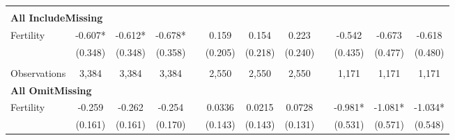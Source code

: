 \begin{landscape}
\begin{table}[htpb!]
\begin{center}
\begin{tabular}{lcccp{2mm}cccp{2mm}ccc}
\begin{footnotesize}\end{footnotesize}\\ 
\multicolumn{12}{l}{\textbf{All IncludeMissing}}\\ 
Fertility&-0.607*&-0.612*&-0.678*&&0.159&0.154&0.223&&-0.542&-0.673&-0.618\\
&(0.348)&(0.348)&(0.358)&&(0.205)&(0.218)&(0.240)&&(0.435)&(0.477)&(0.480)\\
\begin{footnotesize}\end{footnotesize}&\begin{footnotesize}\end{footnotesize}&\begin{footnotesize}\end{footnotesize}&\begin{footnotesize}\end{footnotesize}&\begin{footnotesize}\end{footnotesize}&\begin{footnotesize}\end{footnotesize}&\begin{footnotesize}\end{footnotesize}&\begin{footnotesize}\end{footnotesize}&\begin{footnotesize}\end{footnotesize}&\begin{footnotesize}\end{footnotesize}&\begin{footnotesize}\end{footnotesize}&\begin{footnotesize}\end{footnotesize}\\Observations&3,384&3,384&3,384&&2,550&2,550&2,550&&1,171&1,171&1,171\\
\multicolumn{12}{l}{\textbf{All OmitMissing}}\\ 
Fertility&-0.259&-0.262&-0.254&&0.0336&0.0215&0.0728&&-0.981*&-1.081*&-1.034*\\
&(0.161)&(0.161)&(0.170)&&(0.143)&(0.143)&(0.131)&&(0.531)&(0.571)&(0.548)\\

\end{tabular}
\end{center}
\end{table}
\end{landscape}
